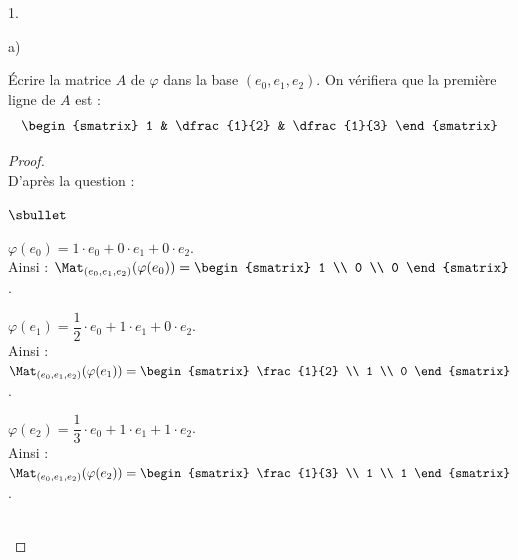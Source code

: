 \begin{noliste}{1.}
  
  \newpage
  
  
\item
  \begin{noliste}{a)}
    \setlength{\itemsep}{2mm}
  \item Écrire la matrice $A$ de $\varphi$ dans la base
    $(e_{0},e_{1},e_{2})$. On vérifiera que la première ligne de $A$
    est :
    \[
    \begin{smatrix}
      1 & \dfrac{1}{2} & \dfrac{1}{3}
    \end{smatrix}
    \]

    \begin{proof}~\\%
      D'après la question  :
      \begin{noliste}{$\sbullet$}
      \item $\varphi(e_0) = 1 \cdot e_0 + 0 \cdot e_1 + 0 \cdot e_2$.\\
        Ainsi : $\Mat_{(e_0, e_1, e_2)}(\varphi(e_0)) =
        \begin{smatrix}
          1 \\
          0 \\
          0
        \end{smatrix}
        $.

      \item $\varphi(e_1) = \dfrac{1}{2} \cdot e_0 + 1 \cdot e_1 + 0
        \cdot e_2$.\\ 
        Ainsi : $\Mat_{(e_0, e_1, e_2)}(\varphi(e_1)) =
        \begin{smatrix}
          \frac{1}{2} \\
          1 \\
          0
        \end{smatrix}
        $.

      \item $\varphi(e_2) = \dfrac{1}{3} \cdot e_0 + 1 \cdot e_1 + 1
        \cdot e_2$.\\ 
        Ainsi : $\Mat_{(e_0, e_1, e_2)}(\varphi(e_2)) =
        \begin{smatrix}
          \frac{1}{3} \\
          1 \\
          1
        \end{smatrix}
        $.        
      \end{noliste}
      ~\\[-1cm]
    \end{proof}


\end{noliste}
\end{noliste}
